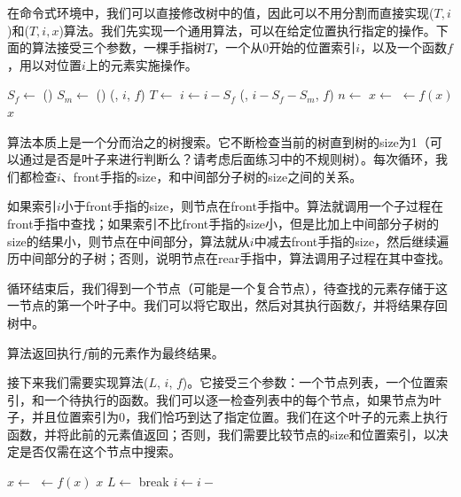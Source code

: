 \documentclass[b5paper]{ctexart}
\begin{document}
在命令式环境中，我们可以直接修改树中的值，因此可以不用分割而直接实现($T, i$)和($T, i, x$)算法。我们先实现一个通用算法，可以在给定位置执行指定的操作。下面的算法接受三个参数，一棵手指树$T$，一个从0开始的位置索引$i$，以及一个函数$f$，用以对位置$i$上的元素实施操作。

\begin{algorithmic}
    \State $S_f \gets $ ()
    \State $S_m \gets $ ()
      \State \Return {}(, $i$, $f$)
      \State $T \gets$ 
      \State $i \gets i - S_f$
    \Else
      \State \Return {}(, $i - S_f - S_m$, $f$)
    \EndIf
  \EndWhile
  \State $n \gets$ 
  \State $x \gets$ 
  \State {} $\gets f(x)$
  \State \Return $x$
\EndFunction
\end{algorithmic}

算法本质上是一个分而治之的树搜索。它不断检查当前的树直到树的size为1（可以通过是否是叶子来进行判断么？请考虑后面练习中的不规则树）。每次循环，我们都检查$i$、front手指的size，和中间部分子树的size之间的关系。

如果索引$i$小于front手指的size，则节点在front手指中。算法就调用一个子过程在front手指中查找；如果索引不比front手指的size小，但是比加上中间部分子树的size的结果小，则节点在中间部分，算法就从$i$中减去front手指的size，然后继续遍历中间部分的子树；否则，说明节点在rear手指中，算法调用子过程在其中查找。

循环结束后，我们得到一个节点（可能是一个复合节点），待查找的元素存储于这一节点的第一个叶子中。我们可以将它取出，然后对其执行函数$f$，并将结果存回树中。

算法返回执行$f$前的元素作为最终结果。

接下来我们需要实现算法($L$, $i$, $f$)。它接受三个参数：一个节点列表，一个位置索引，和一个待执行的函数。我们可以逐一检查列表中的每个节点，如果节点为叶子，并且位置索引为0，我们恰巧到达了指定位置。我们在这个叶子的元素上执行函数，并将此前的元素值返回；否则，我们需要比较节点的size和位置索引，以决定是否仅需在这个节点中搜索。

\begin{algorithmic}
  \Loop
        \State $x \gets $ 
        \State {} $\gets f(x)$
        \State \Return $x$
      \EndIf
        \State $L \gets $ 
        \State break
      \EndIf
      \State $i \gets i - $ 
    \EndFor
  \EndLoop
\EndFunction
\end{algorithmic}
\end{document}
